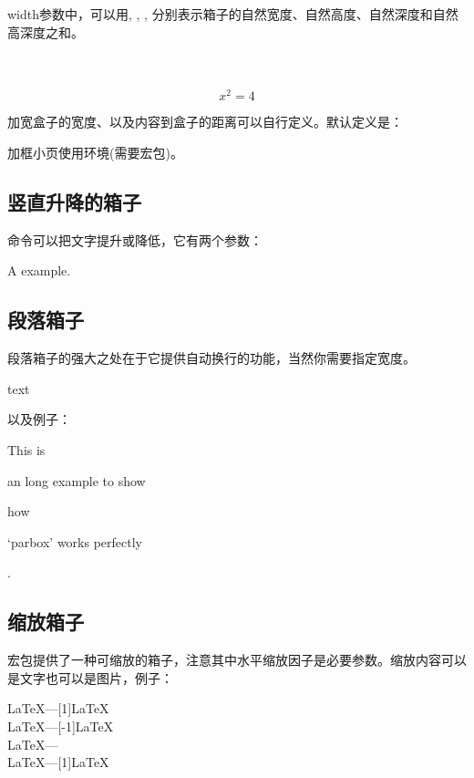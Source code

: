 width参数中，可以用, , , 分别表示箱子的自然宽度、自然高度、自然深度和自然高深度之和。

\begin{codeshow}
 \\
\\
\begin{equation}\boxed{x^2=4}
\end{equation}
\end{codeshow}

加宽盒子的宽度、以及内容到盒子的距离可以自行定义。默认定义是：
\begin{latex}
\setlength{\fboxrule}{0.4pt} \setlength{\fboxsep}{3pt}
\end{latex}

加框小页使用环境(需要宏包)。

\subsection{竖直升降的箱子}
命令可以把文字提升或降低，它有两个参数：

\begin{codeshow}
A\raisebox{-0.5ex}{n} example.
\end{codeshow}

\subsection{段落箱子}
段落箱子的强大之处在于它提供自动换行的功能，当然你需要指定宽度。
\begin{latex}
\parbox[pos]{width}{text}
\end{latex}

以及例子：

\begin{codeshow}
This is \parbox[t]{3.5em}{an long
example to show} how \parbox[b]
{4em}{`parbox' works perfectly}.
\end{codeshow}

\subsection{缩放箱子}
宏包提供了一种可缩放的箱子，注意其中水平缩放因子是必要参数。缩放内容可以是文字也可以是图片，例子：
\begin{codeshow}
\LaTeX---\scalebox{-1}[1]{\LaTeX}\\
\LaTeX---\scalebox{1}[-1]{\LaTeX}\\
\LaTeX---\scalebox{-1}{\LaTeX}\\
\LaTeX---\scalebox{2}[1]{\LaTeX}
\end{codeshow}

